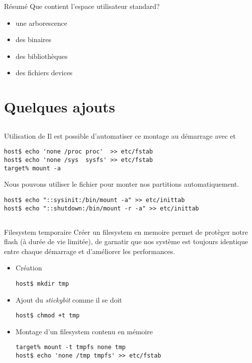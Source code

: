 \begin{frame}{Résumé}
  Que contient l'espace utilisateur standard?
  \begin{itemize}
  \item une arborescence
  \item des binaires
  \item des bibliothèques
  \item des fichiers devices
  \end{itemize}
\end{frame}

\section{Quelques ajouts}
 
\subsection{}

\begin{frame}[fragile=singleslide]{Utilisation de }
  Il  est   possible  d'automatiser  ce  montage   au  démarrage  avec
   et 
  \begin{lstlisting}
host$ echo 'none /proc proc'  >> etc/fstab
host$ echo 'none /sys  sysfs' >> etc/fstab
target% mount -a
  \end{lstlisting}

  Nous pouvons utiliser le  fichier  pour monter nos
  partitions automatiquement.
  \begin{lstlisting}
host$ echo "::sysinit:/bin/mount -a" >> etc/inittab 
host$ echo "::shutdown:/bin/mount -r -a" >> etc/inittab 
  \end{lstlisting}
\end{frame}

\subsection{}

\begin{frame}[fragile=singleslide]{Filesystem temporaire}
  Créer un  filesystem en  memoire permet de  protèger notre  flash (à
  durée  de vie  limitée), de  garnatir que  nos système  est toujours
  identique entre chaque démarrage et d'améliorer les performances.
  \begin{itemize}
    \item Création
    \begin{lstlisting}
host$ mkdir tmp
    \end{lstlisting}
  \item Ajout du \emph{stickybit} comme il se doit
    \begin{lstlisting}
host$ chmod +t tmp
    \end{lstlisting}
  \item Montage d'un filesystem contenu en mémoire
    \begin{lstlisting}
target% mount -t tmpfs none tmp
host$ echo 'none /tmp tmpfs' >> etc/fstab
    \end{lstlisting}
  \end{itemize}
\end{frame}

